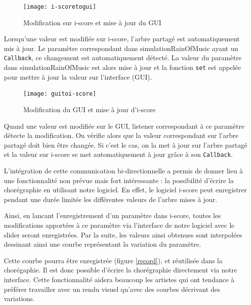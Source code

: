 \begin{figure}[H]
\begin{center}
\texttt{[image: i-scoretogui]}
\caption{Modification sur i-score et mise à jour du GUI}
\label{diag1}
\end{center}
\end{figure}

Lorsqu'une valeur est modifiée sur i-score, l'arbre partagé est automatiquement mis à jour. Le paramètre correspondant dans simulationRainOfMusic ayant un \verb|Callback|, ce changement est automatiquement détecté. La valeur du paramètre dans simulationRainOfMusic est alors mise à jour et la fonction \verb|set| est appelée pour mettre à jour la valeur sur l'interface (GUI).

\begin{figure}[H]
\begin{center}
\texttt{[image: guitoi-score]}
\caption{Modification du GUI et mise à jour d'i-score}
\label{diag2}
\end{center}
\end{figure}

Quand une valeur est modifiée sur le GUI, listener correspondant à ce paramètre détecte la modification. On vérifie alors que la valeur correspondant sur l'arbre partagé doit bien être changée. Si c'est le cas, on la met à jour sur l'arbre partagé et la valeur sur i-score se met automatiquement à jour grâce à son \verb|Callback|. 

L'intégration de cette communication bi-directionnelle a permis de donner lieu à une fonctionnalité non prévue mais fort intéressante : la possibilité d'écrire la chorégraphie en utilisant notre logiciel. En effet, le logiciel i-score peut enregistrer pendant une durée limitée les différentes valeurs de l'arbre mises à jour. 

Ainsi, en lancant l'enregistrement d'un paramètre dans i-score, toutes les modifications apportées à ce paramètre via l'interface de notre logiciel avec le slider seront enregistrées. Par la suite, les valeurs ainsi obtenues sont interpolées dessinant ainsi une courbe représentant la variation du paramètre.

Cette courbe pourra être enregistrée (figure \ref{record}), et réutilisée dans la chorégaphie. Il est donc possible d'écrire la chorégraphie directement via notre interface. Cette fonctionnalité aidera beaucoup les artistes qui ont tendance à préférer travailler avec un rendu visuel qu'avec des courbes décrivant des variations.

